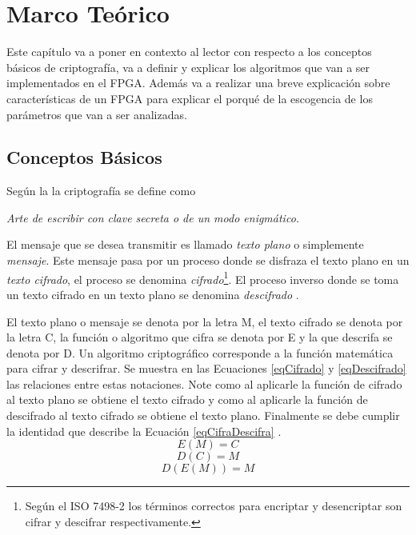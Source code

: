 \chapter{Marco Teórico}

Este capítulo va a poner en contexto al lector con respecto a los conceptos básicos de criptografía, va a definir y explicar los algoritmos que van a ser implementados en el FPGA. Además va a realizar una breve explicación sobre características de un FPGA para explicar el porqué de la escogencia de los parámetros que van a ser analizadas.

\section{Conceptos Básicos}
Según la \cite{raeCriptografia} la criptografía se define como
\begin{center}
    \begin{minipage}{0.9\linewidth}
        \vspace{5pt}%
        {\small
            \emph{Arte de escribir con clave secreta o de un modo enigmático.}
        }
 		\vspace{5pt}%
    \end{minipage}
\end{center}
El mensaje que se desea transmitir es llamado \textit{texto plano} o simplemente \textit{mensaje}. Este mensaje pasa por un proceso donde se disfraza el texto plano en un \textit{texto cifrado}, el proceso se denomina \textit{cifrado}\footnote{Según el ISO 7498-2 los términos correctos para encriptar y desencriptar son cifrar y descifrar respectivamente.}. El proceso inverso donde se toma un texto cifrado en un texto plano se denomina \textit{descifrado} \citep{bruce}. 

El texto plano o mensaje se denota por la letra M, el texto cifrado se denota por la letra C, la función o algoritmo que cifra se denota por E y la que descrifa se denota por D. Un algoritmo criptográfico corresponde a la función matemática para cifrar y descrifrar.
\newline
Se muestra en las Ecuaciones \eqref{eqCifrado} y \eqref{eqDescifrado} las relaciones entre estas notaciones. Note como al aplicarle la función de cifrado al texto plano se obtiene el texto cifrado y como al aplicarle la función de descifrado al texto cifrado se obtiene el texto plano. Finalmente se debe cumplir la identidad que describe la Ecuación \eqref{eqCifraDescifra} \citep{bruce}.
\begin{equation} \label{eqCifrado}
E(M) = C
\end{equation}
\begin{equation} \label{eqDescifrado}
D(C) = M
\end{equation}
\begin{equation} \label{eqCifraDescifra}
D(E(M)) = M
\end{equation}


